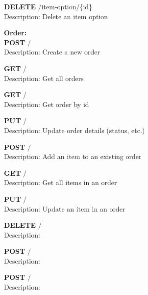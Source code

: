 \documentclass[11pt,a4paper,pdftex]{article}
\begin{document}
\hspace*{1em}\textbf{DELETE} /item-option/\{id\}\\
\hspace*{2em}Description: Delete an item option

\textbf{Order:}\\
\hspace*{1em}\textbf{POST} /\\
\hspace*{2em}Description: Create a new order

\hspace*{1em}\textbf{GET} /\\
\hspace*{2em}Description: Get all orders

\hspace*{1em}\textbf{GET} /\\
\hspace*{2em}Description: Get order by id

\hspace*{1em}\textbf{PUT} /\\
\hspace*{2em}Description: Update order details (status, etc.)

\hspace*{1em}\textbf{POST} /\\
\hspace*{2em}Description: Add an item to an existing order

\hspace*{1em}\textbf{GET} /\\
\hspace*{2em}Description: Get all items in an order

\hspace*{1em}\textbf{PUT} /\\
\hspace*{2em}Description: Update an item in an order

\hspace*{1em}\textbf{DELETE} /\\
\hspace*{2em}Description: 

\hspace*{1em}\textbf{POST} /\\
\hspace*{2em}Description: 

\hspace*{1em}\textbf{POST} /\\
\hspace*{2em}Description: 
\end{document}
